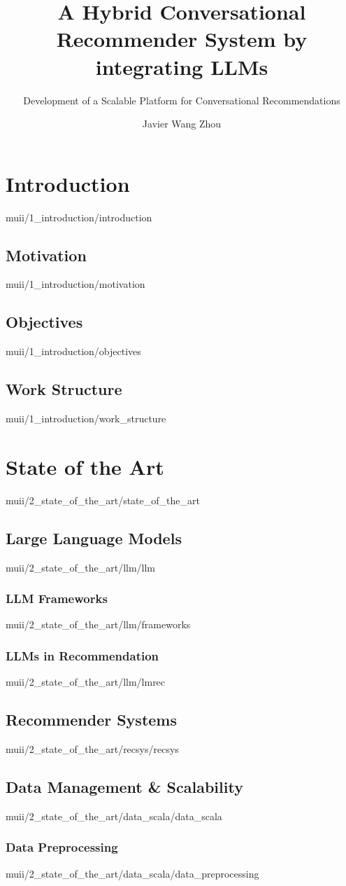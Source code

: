 \documentclass[english,epsbased,copyright,final,printable,covers,extendedindex,firstnumbered,tfm,gnuplot,loc,loe,lof,lot]{tfgtfmthesisuam}
\title{A Hybrid Conversational Recommender System by integrating LLMs}
\subtitle{Development of a Scalable Platform for Conversational Recommendations}
\author{Javier Wang Zhou}
\begin{document}
  \chapter{Introduction\label{CAP:INTRODUCTION}}{muii/1_introduction/introduction}
    \section{Motivation\label{SEC:MOTIVATION}}{muii/1_introduction/motivation}
    \section{Objectives\label{SEC:GOALS}}{muii/1_introduction/objectives}
    \section{Work Structure\label{SEC:WORK_STRUCT}}{muii/1_introduction/work_structure}
  \chapter{State of the Art\label{CAP:STATE_OF_THE_ART}}{muii/2_state_of_the_art/state_of_the_art}
    \section{Large Language Models\label{SEC:LLM}}{muii/2_state_of_the_art/llm/llm}
      \subsection{LLM Frameworks\label{SS:LLMFRAMEWORKS}}{muii/2_state_of_the_art/llm/frameworks}
      \subsection{LLMs in Recommendation\label{SEC:LMREC}}{muii/2_state_of_the_art/llm/lmrec}

    \section{Recommender Systems\label{SEC:RECSYS}}{muii/2_state_of_the_art/recsys/recsys}

    \section{Data Management \& Scalability\label{SEC:DATA_SCALA}}{muii/2_state_of_the_art/data_scala/data_scala}
      \subsection{Data Preprocessing\label{SS:DATAPREPROC}}{muii/2_state_of_the_art/data_scala/data_preprocessing}
\end{document}
